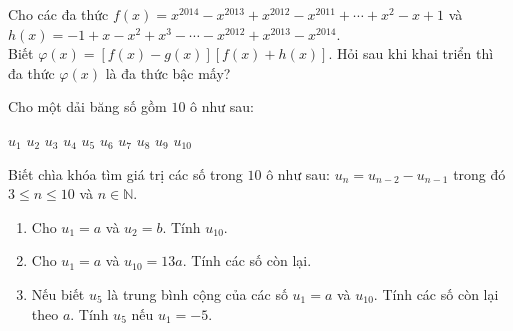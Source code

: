 \begin{vd}%
	Cho các đa thức
	$f(x)=x^{2014}-x^{2013}+x^{2012}-x^{2011}+\cdots+x^2-x+1$ và $h(x)=-1+x-x^2+x^3-\cdots-x^{2012}+x^{2013}-x^{2014}$.\\
	Biết $\varphi (x)=[f(x)-g(x)][f(x)+h(x)]$. Hỏi sau khi khai triển thì đa thức $\varphi (x)$ là đa thức bậc mấy?
\end{vd}

\begin{vd}%
	Cho một dải băng số gồm $10$ ô như sau:
	\begin{center}
		$u_1$ \hspace{0.3cm} $u_2$ \hspace{0.3cm} $u_3$ \hspace{0.3cm} $u_4$ \hspace{0.3cm} $u_5$ \hspace{0.3cm}  $u_6$ \hspace{0.3cm} $u_7$ \hspace{0.3cm} $u_8$ \hspace{0.3cm} $u_9$ \hspace{0.3cm} $u_{10}$ \hspace{0.3cm}
	\end{center}
	Biết chìa khóa tìm giá trị các số trong $10$ ô như sau: $u_n=u_{n-2}-u_{n-1}$ trong đó $3\le n\le 10$ và $n\in \mathbb{N}$.
	\begin{enumerate}
		\item Cho $u_1=a$ và $u_2=b$. Tính $u_{10}$.
		\item Cho $u_1=a$ và $u_{10}=13a$. Tính các số còn lại.
		\item Nếu biết $u_5$ là trung bình cộng của các số $u_1=a$ và $u_{10}$. Tính các số còn lại theo $a$. Tính $u_5$ nếu $u_1=-5.$
	\end{enumerate}
\end{vd}
